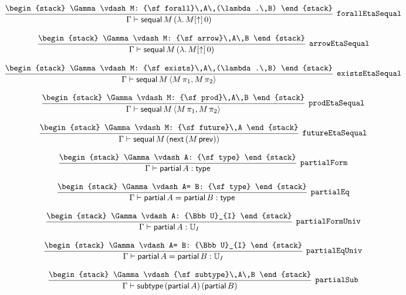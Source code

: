 \[
\infer[{\tt forallEtaSequal}]{\Gamma \vdash {\sf sequal}\,M\,(\lambda .\,M[\uparrow ]\,0)}{
\begin{stack}
\Gamma \vdash M: {\sf forall}\,A\,(\lambda .\,B)
\end{stack}}
\]

\[
\infer[{\tt arrowEtaSequal}]{\Gamma \vdash {\sf sequal}\,M\,(\lambda .\,M[\uparrow ]\,0)}{
\begin{stack}
\Gamma \vdash M: {\sf arrow}\,A\,B
\end{stack}}
\]

\[
\infer[{\tt existsEtaSequal}]{\Gamma \vdash {\sf sequal}\,M\,\langle M\, \pi_1,M\, \pi_2\rangle }{
\begin{stack}
\Gamma \vdash M: {\sf exists}\,A\,(\lambda .\,B)
\end{stack}}
\]

\[
\infer[{\tt prodEtaSequal}]{\Gamma \vdash {\sf sequal}\,M\,\langle M\, \pi_1,M\, \pi_2\rangle }{
\begin{stack}
\Gamma \vdash M: {\sf prod}\,A\,B
\end{stack}}
\]

\[
\infer[{\tt futureEtaSequal}]{\Gamma \vdash {\sf sequal}\,M\,({\sf next}\,(M\, {\sf prev}))}{
\begin{stack}
\Gamma \vdash M: {\sf future}\,A
\end{stack}}
\]

\[
\infer[{\tt partialForm}]{\Gamma \vdash {\sf partial}\,A: {\sf type}}{
\begin{stack}
\Gamma \vdash A: {\sf type}
\end{stack}}
\]

\[
\infer[{\tt partialEq}]{\Gamma \vdash {\sf partial}\,A= {\sf partial}\,B: {\sf type}}{
\begin{stack}
\Gamma \vdash A= B: {\sf type}
\end{stack}}
\]

\[
\infer[{\tt partialFormUniv}]{\Gamma \vdash {\sf partial}\,A: {\Bbb U}_{I}}{
\begin{stack}
\Gamma \vdash A: {\Bbb U}_{I}
\end{stack}}
\]

\[
\infer[{\tt partialEqUniv}]{\Gamma \vdash {\sf partial}\,A= {\sf partial}\,B: {\Bbb U}_{I}}{
\begin{stack}
\Gamma \vdash A= B: {\Bbb U}_{I}
\end{stack}}
\]

\[
\infer[{\tt partialSub}]{\Gamma \vdash {\sf subtype}\,({\sf partial}\,A)\,({\sf partial}\,B)}{
\begin{stack}
\Gamma \vdash {\sf subtype}\,A\,B
\end{stack}}
\]

